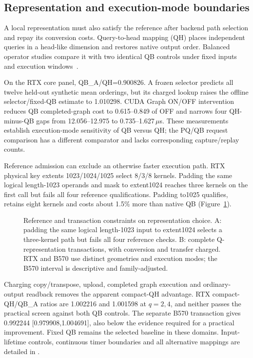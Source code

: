 \subsection{Representation and execution-mode boundaries}
\label{sec:mappingcosts}
A local representation must also satisfy the reference after backend path selection and repay its conversion costs. Query-to-head mapping (QH) places independent queries in a head-like dimension and restores native output order. Balanced operator studies compare it with two identical QB controls under fixed inputs and execution windows~\cite{mappingrecords,b570compactrecords}.

On the RTX core panel, QB\_A/QH=0.900826. A frozen selector predicts all twelve held-out synthetic mean orderings, but its charged lookup raises the offline selector/fixed-QB estimate to 1.010298. CUDA Graph ON/OFF intervention reduces QB completed-graph cost to 0.615--0.849 of OFF and narrows four QH-minus-QB gaps from 12.056--12.975 to 0.735--1.627\,$\mu$s. These measurements establish execution-mode sensitivity of QB versus QH; the PQ/QB request comparison has a different comparator and lacks corresponding capture/replay counts.

Reference admission can exclude an otherwise faster execution path. RTX physical key extents 1023/1024/1025 select 8/3/8 kernels. Padding the same logical length-1023 operands and mask to extent1024 reaches three kernels on the first call but fails all four reference qualifications. Padding to1025 qualifies, retains eight kernels and costs about 1.5\% more than native QB (Figure~\ref{fig:mappingboundary}).

\begin{figure}[t]
\centering
\caption{Reference and transaction constraints on representation choice. A: padding the same logical length-1023 input to extent1024 selects a three-kernel path but fails all four reference checks. B: complete Q-representation transactions, with conversion and transfer charged. RTX and B570 use distinct geometries and execution modes; the B570 interval is descriptive and family-adjusted.}
\label{fig:mappingboundary}
\end{figure}

Charging copy/transpose, upload, completed graph execution and ordinary-output readback removes the apparent compact-QH advantage. RTX compact-QH/QB\_A ratios are 1.002216 and 1.001598 at $q=2,4$, and neither passes the practical screen against both QB controls. The separate B570 transaction gives 0.992244 [0.979908,1.004691], also below the evidence required for a practical improvement. Fixed QB remains the selected baseline in these domains. Input-lifetime controls, continuous timer boundaries and all alternative mappings are detailed in .
